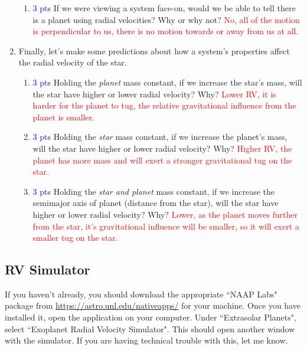\documentclass[11pt]{article}
\begin{document}
\begin{enumerate}
\begin{enumerate}
            \item \textcolor{blue}{3 pts} If we were viewing a system face-on, would we be able to tell there is a planet using radial velocities? Why or why not? \textcolor{red}{No, all of the motion is perpendicular to us, there is no motion towards or away from us at all.}
        \end{enumerate}
        
    \item Finally, let's make some predictions about how a system's properties affect the radial velocity of the star.
    \begin{enumerate}
        \item \textcolor{blue}{3 pts} Holding the \textit{planet} mass constant, if we increase the star's mass, will the star have higher or lower radial velocity? Why? \textcolor{red}{Lower RV, it is harder for the planet to tug, the relative gravitational influence from the planet is smaller.}

        \item \textcolor{blue}{3 pts} Holding the \textit{star} mass constant, if we increase the planet's mass, will the star have higher or lower radial velocity? Why? \textcolor{red}{Higher RV, the planet has more mass and will exert a stronger gravitational tug on the star.}

        \item \textcolor{blue}{3 pts} Holding the \textit{star and planet} mass constant, if we increase the semimajor axis of planet (distance from the star), will the star have higher or lower radial velocity? Why? \textcolor{red}{Lower, as the planet moves further from the star, it's gravitational influence will be smaller, so it will exert a smaller tug on the star.}

    \end{enumerate}
        
\end{enumerate}

\subsection{RV Simulator}
\noindent
If you haven't already, you should download the appropriate ``NAAP Labs" package from \url{https://astro.unl.edu/nativeapps/} for your machine.  Once you have installed it, open the application on your computer.  Under ``Extrasolar Planets", select ``Exoplanet Radial Velocity Simulator".  This should open another window with the simulator.  If you are having technical trouble with this, let me know.
\end{document}
